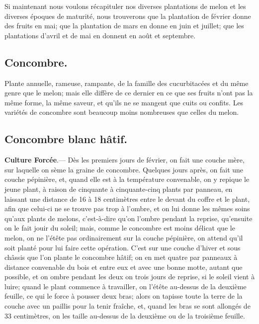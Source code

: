 \documentclass[10pt,a4paper]{book}
\begin{document}
Si maintenant nous voulons récapituler nos diverses plantations de melon et les diverses époques de maturité, nous trouverons que la plantation de février donne des fruits en mai; que la plantation de mars en donne en juin et juillet; que les plantations d'avril et de mai en donnent en août et septembre.

\subsection{Concombre.}

Plante annuelle, rameuse, rampante, de la famille des cucurbitacées et du même genre que le melon; mais elle diffère de ce dernier en ce que ses fruits n'ont pas la même forme, la même saveur, et qu'ils ne se mangent que cuits ou confits. Les variétés de concombre sont beaucoup moins nombreuses que celles du melon.

\subsection{Concombre blanc hâtif.}

\textbf{Culture Forcée}.--- Dès les premiers jours de février, on fait une couche mère, sur laquelle on sème la graine de concombre. Quelques jours après, on fait une couche pépinière, et, quand elle est à la température convenable, on y repique le jeune plant, à raison de cinquante à cinquante-cinq plants par panneau, en laissant une distance de 16 à 18 centimètres entre le devant du coffre et le plant, afin que celui-ci ne se trouve pas trop à l'ombre, et on lui donne les mêmes soins qu'aux plants de melons, c'est-à-dire qu'on l'ombre pendant la reprise, qu'ensuite on le fait jouir du soleil; mais, comme le concombre est moins délicat que le melon, on ne l'étête pas ordinairement sur la couche pépinière, on attend qu'il soit planté pour lui faire cette opération. C'est sur une couche d'hiver et sous châssis que l'on plante le concombre hâtif; on en met quatre par panneaux à distance convenable du bois et entre eux et avec une bonne motte, autant que possible, et on ombre pendant les deux on trois jours de reprise, si le soleil vient à luire; quand le plant commence à travailler, on l'étête au-dessus de la deuxième feuille, ce qui le force à pousser deux bras; alors on tapisse toute la terre de la couche avec un paillis pour la tenir fraîche, et, quand les bras se sont allongés de 33 centimètres, on les taille au-dessus de la deuxième ou de la troisième feuille.
\end{document}
